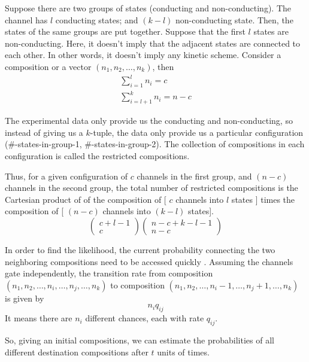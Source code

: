 Suppose there are two groups of states (conducting and non-conducting). The
channel has $l$ conducting states; and $(k-l)$ non-conducting state. Then, the
states of the same groups are put together. Suppose that the first $l$ states
are non-conducting. Here, it doesn't imply that the adjacent states are
connected to each other. In other words, it doesn't imply any kinetic scheme.
Consider a composition or a vector $(n_1, n_2, \ldots, n_k)$, then
\begin{equation}
\begin{split}
\sum_{i=1}^l n_i = c \\
\sum_{i=l+1}^k n_i = n-c
\end{split}
\end{equation}

The experimental data only provide us the conducting and non-conducting, so
instead of giving us a $k$-tuple, the data only provide us a particular
configuration (\#-states-in-group-1, \#-states-in-group-2). The
collection of compositions in each configuration is called the restricted
compositions.

Thus, for a given configuration of $c$ channels in the first group, and $(n-c)$
channels in the second group, the total number of restricted compositions is the
Cartesian  product of of the composition of [ $c$ channels into $l$ states ]
times the composition of [ $(n-c)$ channels into $(k-l)$ states].
\begin{equation}
\left( \begin{array}{c} c+l-1 \\ c \end{array} \right)  \left( \begin{array}{c}
n-c+k-l-1 \\ n-c \end{array} \right)
\end{equation}

In order to find the likelihood, the current probability connecting the two
neighboring compositions need to be accessed quickly \citep{nijenhuis1978}.
Assuming the channels gate independently, the transition rate from composition
$(n_1, n_2, \ldots, n_i, \ldots, n_j, \ldots, n_k)$ to composition $(n_1, n_2,
\ldots, n_i-1, \ldots, n_j+1, \ldots,  n_k)$ is given by
\begin{equation}
n_i q_{ij}
\end{equation}
It means there are $n_i$ different chances, each with rate $q_{ij}$.

So, giving an initial compositions, we can estimate the probabilities of all
different destination compositions after $t$ units of times.


